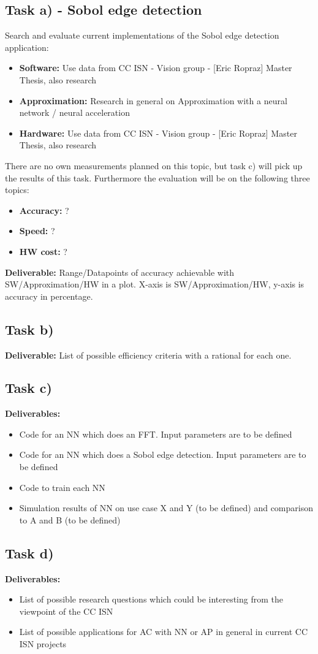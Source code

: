 \subsection*{Task a) - Sobol edge detection}
Search and evaluate current implementations of the Sobol edge detection application:
\begin{itemize}
	\item \textbf{Software:} Use data from CC ISN - Vision group - [Eric Ropraz] Master Thesis, also research
	\item \textbf{Approximation:} Research in general on Approximation with a neural network / neural acceleration
	\item \textbf{Hardware:} Use data from CC ISN - Vision group - [Eric Ropraz] Master Thesis, also research
\end{itemize}
There are no own measurements planned on this topic, but task c) will pick up the results of this task. Furthermore the evaluation will be on the following three topics:
\begin{itemize}
	\item \textbf{Accuracy:} ?
	\item \textbf{Speed:} ?
	\item \textbf{HW cost:} ?
\end{itemize}
\textbf{Deliverable:} Range/Datapoints of accuracy achievable with SW/Approximation/HW in a plot. X-axis is SW/Approximation/HW, y-axis is accuracy in percentage.

\subsection*{Task b)}
\textbf{Deliverable:} List of possible efficiency criteria with a rational for each one.

\subsection*{Task c)}
\textbf{Deliverables:}
\begin{itemize}
	\item Code for an NN which does an FFT. Input parameters are to be defined
	\item Code for an NN which does a Sobol edge detection. Input parameters are to be defined
	\item Code to train each NN
	\item Simulation results of NN on use case X and Y (to be defined) and comparison to A and B (to be defined)
\end{itemize}

\subsection*{Task d)}
\textbf{Deliverables:}
\begin{itemize}
	\item List of possible research questions which could be interesting from the viewpoint of the CC ISN
	\item List of possible applications for AC with NN or AP in general in current CC ISN projects
\end{itemize}